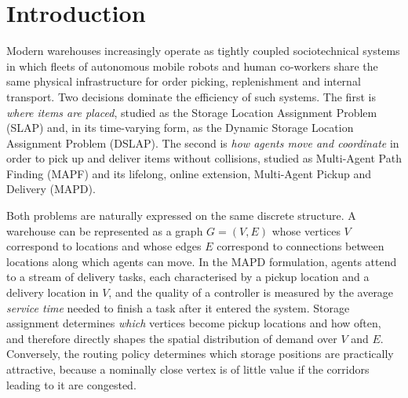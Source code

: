 %


\section{Introduction}

Modern warehouses increasingly operate as tightly coupled sociotechnical
systems in which fleets of autonomous mobile robots and human co-workers
share the same physical infrastructure for order picking, replenishment and
internal transport. Two decisions dominate the efficiency of such systems.
The first is \emph{where items are placed}, studied as the Storage Location
Assignment Problem (SLAP) and, in its time-varying form, as the Dynamic
Storage Location Assignment Problem (DSLAP). The second is \emph{how agents
move and coordinate} in order to pick up and deliver items without
collisions, studied as Multi-Agent Path Finding (MAPF) and its lifelong,
online extension, Multi-Agent Pickup and Delivery (MAPD).

Both problems are naturally expressed on the same discrete structure. A
warehouse can be represented as a graph \( G = (V, E) \) whose vertices
\( V \) correspond to locations and whose edges \( E \) correspond to
connections between locations along which agents can move. In the MAPD
formulation, agents attend to a stream of delivery tasks, each characterised
by a pickup location and a delivery location in \( V \), and the quality of
a controller is measured by the average \emph{service time} needed to finish
a task after it entered the system. Storage assignment determines
\emph{which} vertices become pickup locations and how often, and therefore
directly shapes the spatial distribution of demand over \( V \) and \( E \).
Conversely, the routing policy determines which storage positions are
practically attractive, because a nominally close vertex is of little value
if the corridors leading to it are congested.

